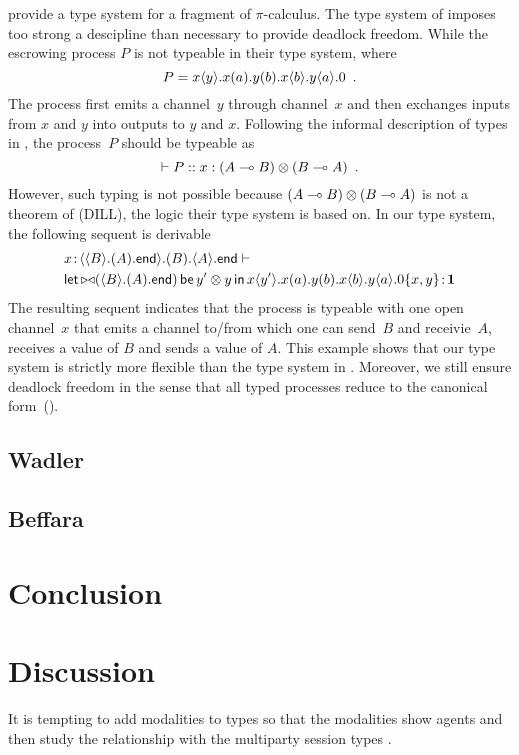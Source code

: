 \citet{pfenning2010} provide a type system for a fragment of $\pi$-calculus.
The type system of \citet{pfenning2010} imposes too strong a descipline
than necessary to provide deadlock freedom.
While the escrowing process $P$ is not typeable in their type
system, where
\[
 P = {x}\langle{y}\rangle.{{{x}({a}).{{{y}({b}).{{x}\langle{b}\rangle.{{y}\langle{a}\rangle.{0}}}}}}}\enspace.
\]
The process first emits a channel~$y$ through channel~$x$ and then
exchanges inputs from $x$ and $y$ into outputs to $y$ and $x$.
Following the informal description of types in \citep{pfenning2010},
the process~$P$ should be typeable as
\[
 \vdash P::x:(A\multimap B)\otimes(B\multimap A)\enspace.
\]
However, such typing is not possible because $(A\multimap B)\otimes (B\multimap
A)$ is not a theorem of  (DILL), the logic their type system
is based on.
In our type system, the following sequent is derivable
\begin{align*}
&
{x} \mathord{\colon\kern -2pt}{\langle{\langle{B}\rangle.{(A).{\mathsf{end}}}}\rangle.{(B).{\langle{A}\rangle.{\mathsf{end}}}}}
\vdash\\
&{
\mathsf{let }\,{\mathop{\triangleright\triangleleft}(\langle{B}\rangle.{(A).{\mathsf{end}}})}\,\mathsf{ be }\,{y'\otimes y}\,\mathsf{ in }\,{{x}\langle{y'}\rangle.{{{x}({a}).{{{y}({b}).{{x}\langle{b}\rangle.{{y}\langle{a}\rangle.{0\{x,y\}}}}}}}}}
} \mathord{\colon\kern -2pt}{\mathbf{1}}
\end{align*}
The resulting sequent indicates that the process is typeable with one
open channel~$x$ that emits
a channel to/from which one can send~$B$ and receivie~$A$, receives a
value of $B$ and
sends a value of $A$.
This example shows that our type system is strictly more flexible than
the type system in \citet{pfenning2010}.
Moreover, we still ensure deadlock freedom in the sense that all typed
processes reduce to the canonical form~().

\subsection{Wadler}

\subsection{Beffara}

\section{Conclusion}


\section{Discussion}

It is tempting to add modalities to types so that the
modalities show agents and then study the relationship with the
multiparty session types .

